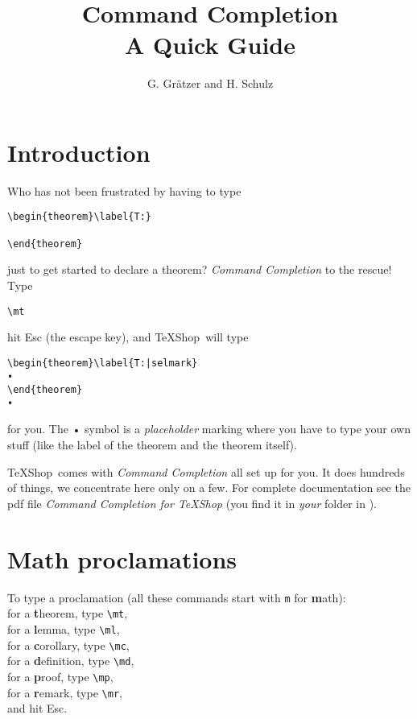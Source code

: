 \documentclass[letterpaper,11pt]{article}
\title{Command Completion\\A Quick Guide}
\author{G. Gr\"atzer and H. Schulz}
\date{}
\newcommand{\TS}{\textsf{\TeX Shop}}
\newcommand{\cmd}[1]{\textsf{#1}}
\begin{document}
\maketitle

\section{Introduction}
Who has not been frustrated by having to type
\begin{verbatim}
\begin{theorem}\label{T:}

\end{theorem}
\end{verbatim}
just to get started to declare a theorem? \emph{Command Completion} 
to the rescue! Type
\begin{verbatim}
\mt
\end{verbatim}
hit \cmd{Esc} (the escape key), and \TS\ will type
\begin{verbatim}
\begin{theorem}\label{T:|selmark}
•
\end{theorem}
•
\end{verbatim}
for you. The • symbol is a \emph{placeholder} marking where you have to type
your own stuff (like the label of the theorem and the theorem itself).

\TS\ comes with \emph{Command Completion} all set up for you. 
It does hundreds of things, we concentrate here only on a few. 
For complete documentation see the pdf file
\emph{Command Completion for \TS} (you find it in \emph{your}  folder
in ).

\section{Math proclamations}

To type a proclamation (all these commands start with \verb|m| 
for \textbf{m}ath):\\ 
for a \textbf{t}heorem, type \verb|\mt|,\\
for a \textbf{l}emma, type \verb|\ml|,\\
for a \textbf{c}orollary, type \verb|\mc|,\\
for a \textbf{d}efinition, type \verb|\md|,\\
for a \textbf{p}roof, type \verb|\mp|,\\
for a \textbf{r}emark, type \verb|\mr|,\\
and hit \cmd{Esc}. %
\end{document}
